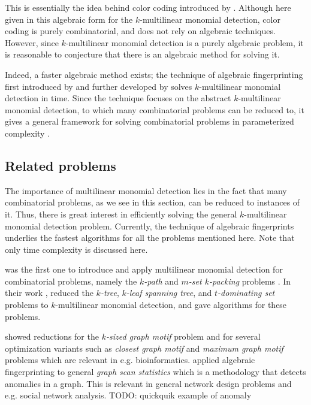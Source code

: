 This is essentially the idea behind color coding 
introduced by \textcite{Alon95}. 
Although here given in this algebraic form for 
the $k$-multilinear monomial detection, 
color coding is purely combinatorial, 
and does not rely on algebraic techniques. 
However, since $k$-multilinear monomial detection is a 
purely algebraic problem, it is reasonable to 
conjecture that there is an algebraic method for solving it.

Indeed, a faster algebraic method exists; the technique of algebraic fingerprinting 
first introduced by \textcite{Koutis08} and 
further developed by \textcite{Williams09} 
solves $k$-multilinear monomial detection in  time. 
Since the technique focuses on the abstract $k$-multilinear monomial detection, 
to which many combinatorial problems can be reduced to, 
it gives a general framework for 
solving combinatorial problems in parameterized complexity \cite{KouWil15}.

\subsection{Related problems}
\label{sect:related_problems}

The importance of multilinear monomial detection lies in the fact 
that many combinatorial problems, as we see in this section, 
can be reduced to instances of it. 
Thus, there is great interest in efficiently solving the 
general $k$-multilinear monomial detection problem. 
Currently, the technique of algebraic fingerprints underlies the fastest algorithms 
for all the problems mentioned here. 
Note that only time complexity is discussed here. 

\citeauthor{Koutis08} was the first one to introduce and apply multilinear monomial 
detection for combinatorial problems, namely the \emph{$k$-path} and \emph{$m$-set $k$-packing} problems 
\cite{Koutis08}. 
In their work \cite{KouWil09}, \citeauthor{KouWil09} reduced 
the \emph{$k$-tree}, \emph{$k$-leaf spanning tree}, and \emph{$t$-dominating set} problems 
to $k$-multilinear monomial detection, and 
gave  algorithms for these problems.  

\textcite{Björklund16} showed reductions for the 
\emph{$k$-sized graph motif} problem and for
several optimization variants such as \emph{closest graph motif} 
and \emph{maximum graph motif} problems which are relevant in e.g. bioinformatics. 
\textcite{Cadena17} 
applied algebraic fingerprinting to general \emph{graph scan statistics} 
which is a methodology that detects anomalies in a graph. This is relevant in 
general network design problems and e.g. social network analysis. TODO: quickquik example of anomaly

